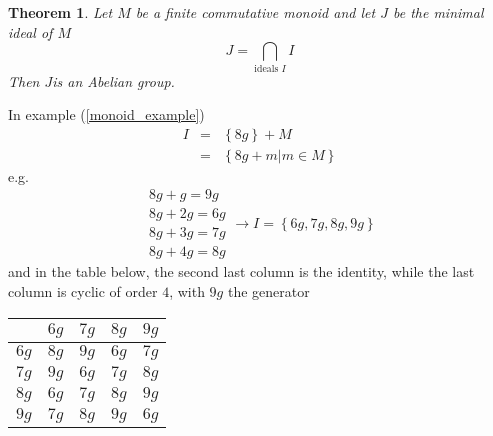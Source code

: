 \documentclass[11pt,english]{article}
\providecommand{\tabularnewline}{\\}
\newtheorem{theorem}{Theorem}
\begin{document}
\begin{theorem}

Let $M$ be a finite commutative monoid and let $J$ be the minimal
ideal of $M$\[
J=\bigcap_{\text{ideals }I}I\]
Then $J$is an Abelian group.

\end{theorem}

In example (\ref{monoid_example}) \begin{eqnarray*}
I & = & \left\{ 8g\right\} +M\\
 & = & \left\{ \left.8g+m\right|m\in M\right\} \end{eqnarray*}
e.g.\[
\begin{array}{c}
8g+g=9g\\
8g+2g=6g\\
8g+3g=7g\\
8g+4g=8g\end{array}\rightarrow I=\left\{ 6g,7g,8g,9g\right\} \]
and in the table below, the second last column is the identity, while
the last column is cyclic of order $4$, with $9g$ the generator

\begin{center}
\begin{tabular}{|c||c|c|c|c|}
\cline{2-5} 
\multicolumn{1}{c|}{} & $6g$ & $7g$ & $8g$ & $9g$\tabularnewline
\hline
\hline 
$6g$ & $8g$ & $9g$ & $6g$ & $7g$\tabularnewline
\hline 
$7g$ & $9g$ & $6g$ & $7g$ & $8g$\tabularnewline
\hline 
$8g$ & $6g$ & $7g$ & $8g$ & $9g$\tabularnewline
\hline 
$9g$ & $7g$ & $8g$ & $9g$ & $6g$\tabularnewline
\hline
\end{tabular}
\par\end{center}
\end{document}
